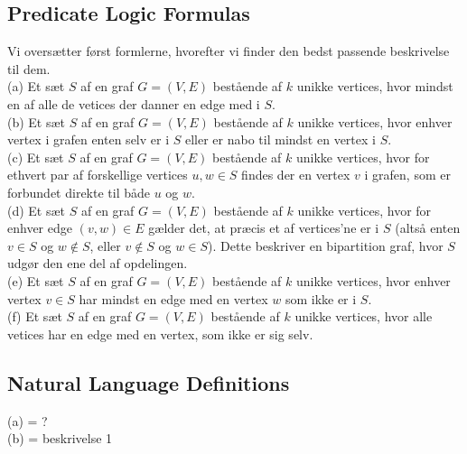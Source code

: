\documentclass[a4paper,12pt]{article}
\begin{document}
\subsection{Predicate Logic Formulas}
Vi oversætter først formlerne, hvorefter vi finder den bedst passende beskrivelse til dem.\\

(a) Et sæt $S$ af en graf $G=(V,E)$ bestående af $k$ unikke vertices, hvor mindst en af alle de vetices der danner en edge med i $S$.\\

(b) Et sæt $S$ af en graf $G=(V,E)$ bestående af $k$ unikke vertices, hvor enhver vertex i grafen enten selv er i $S$ eller er nabo til mindst en vertex i $S$.\\

(c) Et sæt $S$ af en graf $G=(V,E)$ bestående af $k$ unikke vertices, hvor for ethvert par af forskellige vertices $u,w \in S$ findes der en vertex $v$ i grafen, som er forbundet direkte til både $u$ og $w$.\\

(d) Et sæt $S$ af en graf $G=(V,E)$ bestående af $k$ unikke vertices, hvor for enhver edge $(v,w) \in E$ gælder det, at præcis et af vertices'ne er i $S$ (altså enten $v \in S$ og $w \notin S$, eller $v \notin S$ og $w \in S$). Dette beskriver en bipartition graf, hvor $S$ udgør den ene del af opdelingen.\\

(e) Et sæt $S$ af en graf $G=(V,E)$ bestående af $k$ unikke vertices, hvor enhver vertex $v \in S$ har mindst en edge med en vertex $w$ som ikke er i $S$.\\

(f) Et sæt $S$ af en graf $G=(V,E)$ bestående af $k$ unikke vertices, hvor alle vetices har en edge med en vertex, som ikke er sig selv.\\

\subsection{Natural Language Definitions}
(a) = ?\\
(b) = beskrivelse 1
\end{document}
